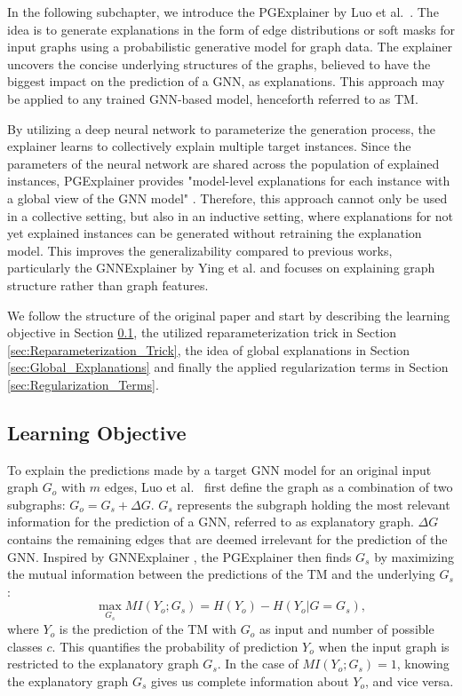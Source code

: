 In the following subchapter, we introduce the PGExplainer by Luo et al.~\cite{luo2020parameterized}. The idea is to generate explanations in the form of edge distributions or soft masks for input graphs using a probabilistic generative model for graph data. The explainer uncovers the concise underlying structures of the graphs, believed to have the biggest impact on the prediction of a GNN, as explanations. This approach may be applied to any trained GNN-based model, henceforth referred to as \ac{TM}. 

By utilizing a deep neural network to parameterize the generation process, the explainer learns to collectively explain multiple target instances. Since the parameters of the neural network are shared across the population of explained instances, PGExplainer provides "model-level explanations for each instance with a global view of the GNN model" \cite{luo2020parameterized}. Therefore, this approach cannot only be used in a collective setting, but also in an inductive setting, where explanations for not yet explained instances can be generated without retraining the explanation model. This improves the generalizability compared to previous works, particularly the GNNExplainer by Ying et al. \cite{ying2019gnnexplainer} and focuses on explaining graph structure rather than graph features. \bigskip

We follow the structure of the original paper \cite{luo2020parameterized} and start by describing the learning objective in Section \ref{sec:learning_objective}, the utilized reparameterization trick in Section \ref{sec:Reparameterization_Trick}, the idea of global explanations in Section \ref{sec:Global_Explanations} and finally the applied regularization terms in Section \ref{sec:Regularization_Terms}.

\subsection{Learning Objective}
\label{sec:learning_objective}
To explain the predictions made by a target GNN model for an original input graph $G_o$ with $m$ edges, Luo et al.~\cite{luo2020parameterized} first define the graph as a combination of two subgraphs: $G_o = G_s + \Delta G$. $G_s$ represents the subgraph holding the most relevant information for the prediction of a GNN, referred to as explanatory graph. $\Delta G$ contains the remaining edges that are deemed irrelevant for the prediction of the GNN. Inspired by GNNExplainer \cite{ying2019gnnexplainer}, the PGExplainer then finds $G_s$ by maximizing the mutual information between the predictions of the \ac{TM} and the underlying $G_s$:
\begin{equation}
    \max_{G_s} MI(Y_o;G_s) = H(Y_o) - H(Y_o|G=G_s),
\end{equation} 
where $Y_o$ is the prediction of the \ac{TM} with $G_o$ as input and number of possible classes $c$. This quantifies the probability of prediction $Y_o$ when the input graph is restricted to the explanatory graph $G_s$. In the case of $MI(Y_o;G_s) = 1$, knowing the explanatory graph $G_s$ gives us complete information about $Y_o$, and vice versa.

